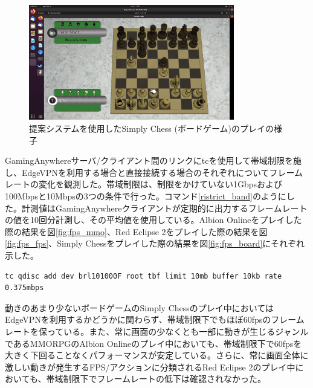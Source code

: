 \begin{figure}[t]
    \centering
    \includegraphics[width=0.8\textwidth,keepaspectratio,clip]{img/screen_board.pdf}
    \caption{提案システムを使用したSimply Chess (ボードゲーム)のプレイの様子}
    \label{fig:screen_board}
\end{figure}

GamingAnywhereサーバ/クライアント間のリンクにtcを使用して帯域制限を施し、EdgeVPNを利用する場合と直接接続する場合のそれぞれについてフレームレートの変化を観測した。帯域制限は、制限をかけていない1Gbpsおよび100Mbpsと10Mbpsの3つの条件で行った。コマンド\ref{ristrict_band}のようにした。計測値はGamingAnywhereクライアントが定期的に出力するフレームレートの値を10回分計測し、その平均値を使用している。Albion Onlineをプレイした際の結果を図\ref{fig:fps_mmo}、Red Eclipse 2をプレイした際の結果を図\ref{fig:fps_fps}、Simply Chessをプレイした際の結果を図\ref{fig:fps_board}にそれぞれ示した。

\begin{lstlisting}[caption=帯域制限,label=ristrict_band]
    tc qdisc add dev brl101000F root tbf limit 10mb buffer 10kb rate 0.375mbps
\end{lstlisting}

動きのあまり少ないボードゲームのSimply Chessのプレイ中においてはEdgeVPNを利用するかどうかに関わらず、帯域制限下でもほぼ60fpsのフレームレートを保っている。また、常に画面の少なくとも一部に動きが生じるジャンルであるMMORPGのAlbion Onlineのプレイ中においても、帯域制限下で60fpsを大きく下回ることなくパフォーマンスが安定している。さらに、常に画面全体に激しい動きが発生するFPS/アクションに分類されるRed Eclipse 2のプレイ中においても、帯域制限下でフレームレートの低下は確認されなかった。

